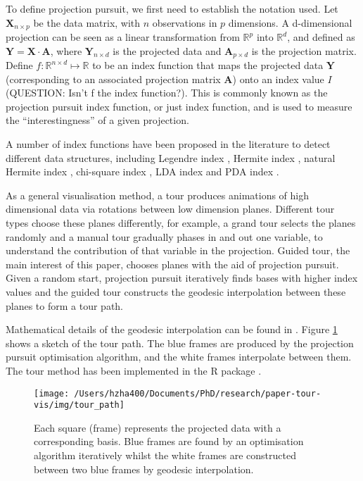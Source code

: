 To define projection pursuit, we first need to establish the notation
used. Let \(\mathbf{X}_{n \times p}\) be the data matrix, with \(n\)
observations in \(p\) dimensions. A d-dimensional projection can be seen
as a linear transformation from \(\mathbb{R}^p\) into \(\mathbb{R}^d\),
and defined as \(\mathbf{Y} = \mathbf{X} \cdot \mathbf{A}\), where
\(\mathbf{Y}_{n \times d}\) is the projected data and
\(\mathbf{A}_{p\times d}\) is the projection matrix. Define
\(f: \mathbb{R}^{n \times d} \mapsto \mathbb{R}\) to be an index
function that maps the projected data \(\mathbf{Y}\) (corresponding to
an associated projection matrix \(\mathbf{A}\)) onto an index value
\(I\) (QUESTION: Isn't f the index function?). This is commonly known as
the projection pursuit index function, or just index function, and is
used to measure the ``interestingness'' of a given projection.

A number of index functions have been proposed in the literature to
detect different data structures, including Legendre index
\citep{friedman1974projection}, Hermite index
\citep{hall1989polynomial}, natural Hermite index
\citep{cook1993projection}, chi-square index
\citep{posse1995projection}, LDA index \citep{lee2005projection} and PDA
index \citep{lee2010projection}.

As a general visualisation method, a tour produces animations of high
dimensional data via rotations between low dimension planes. Different
tour types choose these planes differently, for example, a grand tour
\citep{cook2008grand} selects the planes randomly and a manual tour
\citep{cook1997manual} gradually phases in and out one variable, to
understand the contribution of that variable in the projection. Guided
tour, the main interest of this paper, chooses planes with the aid of
projection pursuit. Given a random start, projection pursuit iteratively
finds bases with higher index values and the guided tour constructs the
geodesic interpolation between these planes to form a tour path.

Mathematical details of the geodesic interpolation can be found in
\citet{buja2005computational}. Figure \ref{fig:tour-path} shows a sketch
of the tour path. The blue frames are produced by the projection pursuit
optimisation algorithm, and the white frames interpolate between them.
The tour method has been implemented in the R package 
\citep{tourr}.

\begin{Schunk}
\begin{figure}

{\centering \texttt{[image: /Users/hzha400/Documents/PhD/research/paper-tour-vis/img/tour\_path]} 

}

\caption[Each square (frame) represents the projected data with a corresponding basis]{Each square (frame) represents the projected data with a corresponding basis. Blue frames are found by an optimisation algorithm iteratively whilst the white frames are constructed between two blue frames by geodesic interpolation.}\label{fig:tour-path}
\end{figure}
\end{Schunk}

